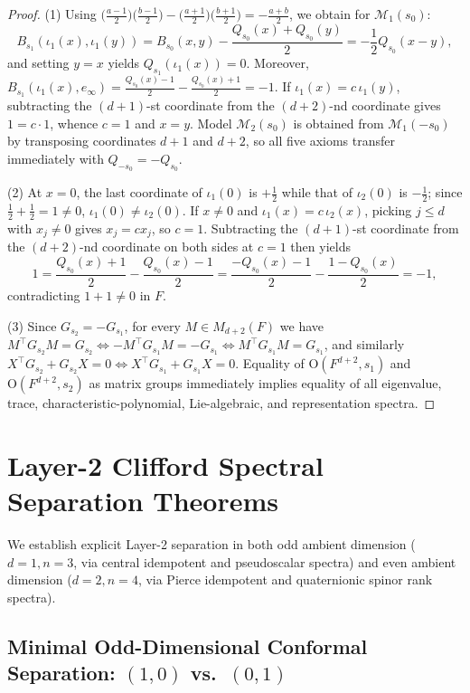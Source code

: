 \documentclass[11pt]{article}
\theoremstyle{definition}
\newcommand{\Orth}{\mathrm{O}}
\begin{document}
\begin{proof}
(1) Using $\bigl(\frac{a - 1}{2}\bigr)\bigl(\frac{b - 1}{2}\bigr) - \bigl(\frac{a + 1}{2}\bigr)\bigl(\frac{b + 1}{2}\bigr) = -\frac{a + b}{2}$, we obtain for $\mathcal{M}_1(s_0)$:
\[
  B_{s_1}(\iota_1(x), \iota_1(y)) = B_{s_0}(x, y) - \frac{Q_{s_0}(x) + Q_{s_0}(y)}{2} = -\frac{1}{2} Q_{s_0}(x - y),
\]
and setting $y = x$ yields $Q_{s_1}(\iota_1(x)) = 0$. Moreover, $B_{s_1}(\iota_1(x), e_\infty) = \frac{Q_{s_0}(x) - 1}{2} - \frac{Q_{s_0}(x) + 1}{2} = -1$. If $\iota_1(x) = c\,\iota_1(y)$, subtracting the $(d+1)$-st coordinate from the $(d+2)$-nd coordinate gives $1 = c \cdot 1$, whence $c = 1$ and $x = y$. Model $\mathcal{M}_2(s_0)$ is obtained from $\mathcal{M}_1(-s_0)$ by transposing coordinates $d+1$ and $d+2$, so all five axioms transfer immediately with $Q_{-s_0} = -Q_{s_0}$.

(2) At $x = 0$, the last coordinate of $\iota_1(0)$ is $+\frac{1}{2}$ while that of $\iota_2(0)$ is $-\frac{1}{2}$; since $\frac{1}{2} + \frac{1}{2} = 1 \neq 0$, $\iota_1(0) \neq \iota_2(0)$. If $x \neq 0$ and $\iota_1(x) = c\,\iota_2(x)$, picking $j \le d$ with $x_j \neq 0$ gives $x_j = c x_j$, so $c = 1$. Subtracting the $(d+1)$-st coordinate from the $(d+2)$-nd coordinate on both sides at $c = 1$ then yields
\[
  1 = \frac{Q_{s_0}(x) + 1}{2} - \frac{Q_{s_0}(x) - 1}{2}
    = \frac{-Q_{s_0}(x) - 1}{2} - \frac{1 - Q_{s_0}(x)}{2} = -1,
\]
contradicting $1 + 1 \neq 0$ in $F$.

(3) Since $G_{s_2} = -G_{s_1}$, for every $M \in M_{d+2}(F)$ we have $M^\top G_{s_2} M = G_{s_2} \iff -M^\top G_{s_1} M = -G_{s_1} \iff M^\top G_{s_1} M = G_{s_1}$, and similarly $X^\top G_{s_2} + G_{s_2} X = 0 \iff X^\top G_{s_1} + G_{s_1} X = 0$. Equality of $\Orth(F^{d+2}, s_1)$ and $\Orth(F^{d+2}, s_2)$ as matrix groups immediately implies equality of all eigenvalue, trace, characteristic-polynomial, Lie-algebraic, and representation spectra.
\end{proof}

\section{Layer-2 Clifford Spectral Separation Theorems}

We establish explicit Layer-2 separation in both odd ambient dimension ($d = 1, n = 3$, via central idempotent and pseudoscalar spectra) and even ambient dimension ($d = 2, n = 4$, via Pierce idempotent and quaternionic spinor rank spectra).

\subsection{Minimal Odd-Dimensional Conformal Separation: \texorpdfstring{$(1, 0)$ vs.\ $(0, 1)$}{(1, 0) vs. (0, 1)}}
\end{document}
